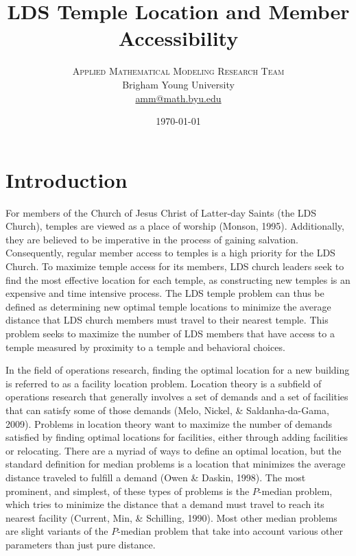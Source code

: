 \documentclass[twoside,twocolumn]{article}
\title{LDS Temple Location and Member Accessibility} %
\author{%
\textsc{Applied Mathematical Modeling Research Team}\\[1ex] %
\normalsize Brigham Young University  \\ %
\normalsize \href{mailto:amm@math.byu.edu}{amm@math.byu.edu} %
}
\date{\today} %
\begin{document}
\maketitle



\section{Introduction}


For members of the Church of Jesus Christ of Latter-day Saints (the LDS Church), temples are viewed as a place of worship (Monson, 1995).
Additionally, they are believed to be imperative in the process of gaining salvation.
Consequently, regular member access to temples is a high priority for the LDS Church.
To maximize temple access for its members, LDS church leaders seek to find the most effective location for each temple, as constructing new temples is an expensive and time intensive process.
The LDS temple problem can thus be defined as determining new optimal temple locations to minimize the average distance that LDS church members must travel to their nearest temple.
This problem seeks to maximize the number of LDS members that have access to a temple measured by proximity to a temple and behavioral choices.

In the field of operations research, finding the optimal location for a new building is referred to as a facility location problem.
Location theory is a subfield of operations research that generally involves a set of demands and a set of facilities that can satisfy some of those demands (Melo, Nickel, \& Saldanha-da-Gama, 2009).
Problems in location theory want to maximize the number of demands satisfied by finding optimal locations for facilities, either through adding facilities or relocating.
There are a myriad of ways to define an optimal location, but the standard definition for median problems is a location that minimizes the average distance traveled to fulfill a demand (Owen \& Daskin, 1998).
The most prominent, and simplest, of these types of problems is the $P$-median problem, which tries to minimize the distance that a demand must travel to reach its nearest facility (Current, Min, \& Schilling, 1990).
Most other median problems are slight variants of the $P$-median problem that take into account various other parameters than just pure distance.
\end{document}
